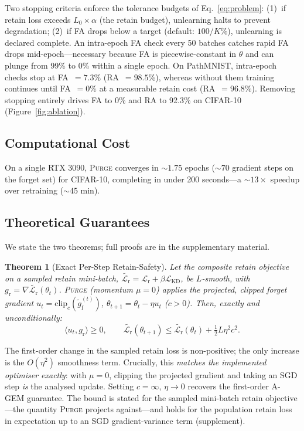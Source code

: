 \documentclass[letterpaper]{article} %
\newcommand{\ours}{\textsc{Purge}}
\newcommand{\gr}{g_{\mathrm{r}}}
\newcommand{\gproj}{\tilde{g}_{\mathrm{f}}}
\newcommand{\lossr}{\mathcal{L}_{\mathrm{r}}}
\newcommand{\losskd}{\mathcal{L}_{\mathrm{KD}}}
\newtheorem{theorem}{Theorem}
\begin{document}
Two stopping criteria enforce the tolerance budgets of Eq.~\ref{eq:problem}:
(1)~if retain loss exceeds $L_0 \times \alpha$ (the retain budget), unlearning halts to prevent degradation;
(2)~if FA drops below a target (default: $100/K$\%), unlearning is declared complete.
An intra-epoch FA check every 50 batches catches rapid FA drops mid-epoch---necessary because FA is piecewise-constant in $\theta$ and can plunge from 99\% to 0\% within a single epoch.
On PathMNIST, intra-epoch checks stop at FA~$= 7.3$\% (RA~$= 98.5$\%), whereas without them training continues until FA~$= 0$\% at a measurable retain cost (RA~$= 96.8$\%).
Removing stopping entirely drives FA to 0\% and RA to 92.3\% on CIFAR-10 (Figure~\ref{fig:ablation}).

\subsection{Computational Cost}

On a single RTX 3090, \ours{} converges in ${\sim}1.75$ epochs (${\sim}70$ gradient steps on the forget set) for CIFAR-10, completing in under 200 seconds---a ${\sim}13\times$ speedup over retraining (${\sim}45$ min).

\subsection{Theoretical Guarantees}

We state the two theorems; full proofs are in the supplementary material.

\begin{theorem}[Exact Per-Step Retain-Safety]\label{thm:retain_safety}
Let the composite retain objective on a sampled retain mini-batch, $\widetilde{\lossr} {=} \lossr {+} \beta\losskd$, be $L$-smooth, with $\gr {=} \nabla\widetilde{\lossr}(\theta_t)$. \ours{} (momentum $\mu {=} 0$) applies the projected, clipped forget gradient $u_t {=} \mathrm{clip}_c(\gproj^{(t)})$, $\theta_{t+1} {=} \theta_t {-} \eta u_t$ ($c {>} 0$). Then, \emph{exactly and unconditionally}:
\begin{equation}\label{eq:thm1}
\langle u_t, \gr\rangle \ge 0, \qquad \widetilde{\lossr}(\theta_{t+1}) \le \widetilde{\lossr}(\theta_t) + \tfrac{1}{2}L\eta^2 c^2.
\end{equation}
\end{theorem}
The first-order change in the sampled retain loss is non-positive; the only increase is the $O(\eta^2)$ smoothness term. Crucially, this \emph{matches the implemented optimiser exactly}: with $\mu {=} 0$, clipping the projected gradient and taking an SGD step \emph{is} the analysed update. Setting $c {=} \infty$, $\eta {\to} 0$ recovers the first-order A-GEM guarantee. The bound is stated for the sampled mini-batch retain objective---the quantity \ours{} projects against---and holds for the population retain loss in expectation up to an SGD gradient-variance term (supplement).
\end{document}
